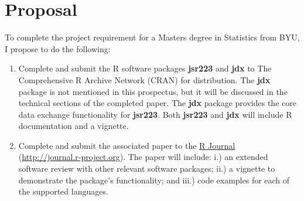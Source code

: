 
\chapter{Proposal}

To complete the project requirement for a Masters degree in Statistics from BYU, I propose to do the following:

\begin{enumerate}
\item Complete and submit the R software packages \textbf{jsr223} and \textbf{jdx} to The Comprehensive R Archive Network (CRAN) for distribution. The \textbf{jdx} package is not mentioned in this prospectus, but it will be discussed in the technical sections of the completed paper. The \textbf{jdx} package provides the core data exchange functionality for \textbf{jsr223}. Both \textbf{jsr223} and \textbf{jdx} will include R documentation and a vignette.

\item Complete and submit the associated paper to the \href{http://journal.r-project.org}{R Journal} \\ (\href{http://journal.r-project.org}{http://journal.r-project.org}). The paper will include: i.) an extended software review with other relevant software packages; ii.) a vignette to demonstrate the package's functionality; and iii.) code examples for each of the supported languages.
\end{enumerate}
